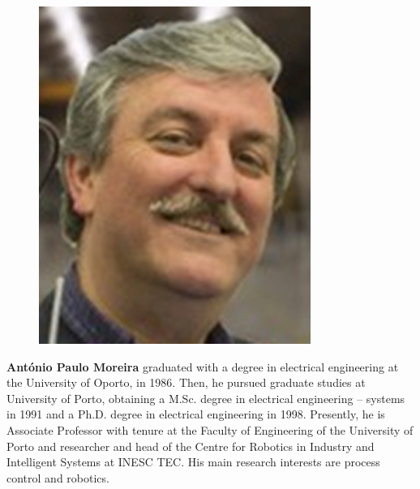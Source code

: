 \documentclass[10pt,a4paper,notitlepage,twocolumn,oneside]{article}
\begin{document}
\begin{figure}
\centering
\includegraphics[width=0.25\columnwidth]{figures/moreira.png}
\end{figure}
\noindent \textbf{Ant\'{o}nio Paulo Moreira} graduated with a degree in electrical engineering at the University of Oporto, in 1986. Then, he pursued graduate studies at University of Porto, obtaining a M.Sc. degree in electrical engineering -- systems in 1991 and a Ph.D. degree in electrical engineering in 1998. Presently, he is Associate Professor with tenure at the Faculty of Engineering of the University of Porto and researcher and head of the Centre for Robotics in Industry and Intelligent Systems at INESC TEC. His main research interests are process control and robotics.




\cleardoublepage


\end{document}
